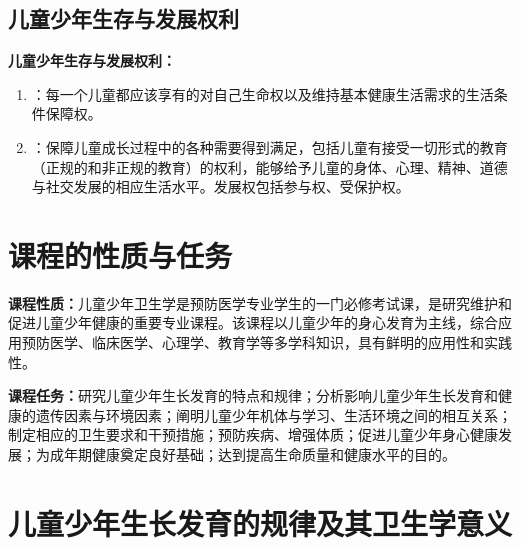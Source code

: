 \subsection{儿童少年生存与发展权利}

\begin{defbox}
\textbf{儿童少年生存与发展权利：}

\begin{enumerate}[leftmargin=*]
    \item {}：每一个儿童都应该享有的对自己生命权以及维持基本健康生活需求的生活条件保障权。

    \item {}：保障儿童成长过程中的各种需要得到满足，包括儿童有接受一切形式的教育（正规的和非正规的教育）的权利，能够给予儿童的身体、心理、精神、道德与社交发展的相应生活水平。发展权包括参与权、受保护权。
\end{enumerate}
\end{defbox}

\section{课程的性质与任务}

\begin{defbox}
\textbf{课程性质：}儿童少年卫生学是预防医学专业学生的一门必修考试课，是研究维护和促进儿童少年健康的重要专业课程。该课程以儿童少年的身心发育为主线，综合应用预防医学、临床医学、心理学、教育学等多学科知识，具有鲜明的应用性和实践性。

\textbf{课程任务：}研究儿童少年生长发育的特点和规律；分析影响儿童少年生长发育和健康的遗传因素与环境因素；阐明儿童少年机体与学习、生活环境之间的相互关系；制定相应的卫生要求和干预措施；预防疾病、增强体质；促进儿童少年身心健康发展；为成年期健康奠定良好基础；达到提高生命质量和健康水平的目的。
\end{defbox}

\section{儿童少年生长发育的规律及其卫生学意义}

